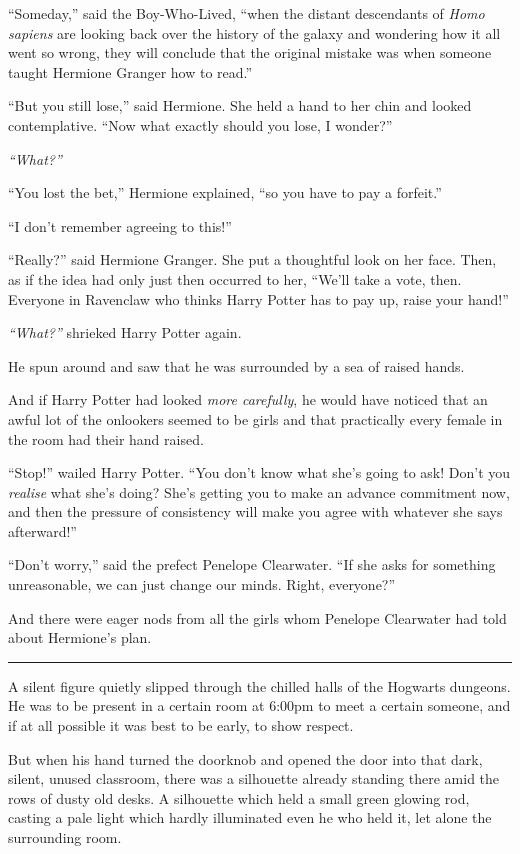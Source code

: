 ``Someday,'' said the Boy-Who-Lived, ``when the distant descendants of
\emph{Homo sapiens} are looking back over the history of the galaxy and
wondering how it all went so wrong, they will conclude that the original
mistake was when someone taught Hermione Granger how to read.''

``But you still lose,'' said Hermione. She held a hand to her chin and
looked contemplative. ``Now what exactly should you lose, I wonder?''

\emph{``What?''}

``You lost the bet,'' Hermione explained, ``so you have to pay a
forfeit.''

``I don't remember agreeing to this!''

``Really?'' said Hermione Granger. She put a thoughtful look on her
face. Then, as if the idea had only just then occurred to her, ``We'll
take a vote, then. Everyone in Ravenclaw who thinks Harry Potter has to
pay up, raise your hand!''

\emph{``What?''} shrieked Harry Potter again.

He spun around and saw that he was surrounded by a sea of raised hands.

And if Harry Potter had looked \emph{more carefully}, he would have
noticed that an awful lot of the onlookers seemed to be girls and that
practically every female in the room had their hand raised.

``Stop!'' wailed Harry Potter. ``You don't know what she's going to ask!
Don't you \emph{realise} what she's doing? She's getting you to make an
advance commitment now, and then the pressure of consistency will make
you agree with whatever she says afterward!''

``Don't worry,'' said the prefect Penelope Clearwater. ``If she asks for
something unreasonable, we can just change our minds. Right, everyone?''

And there were eager nods from all the girls whom Penelope Clearwater
had told about Hermione's plan.

\begin{center}\rule{3in}{0.4pt}\end{center}

A silent figure quietly slipped through the chilled halls of the
Hogwarts dungeons. He was to be present in a certain room at 6:00pm to
meet a certain someone, and if at all possible it was best to be early,
to show respect.

But when his hand turned the doorknob and opened the door into that
dark, silent, unused classroom, there was a silhouette already standing
there amid the rows of dusty old desks. A silhouette which held a small
green glowing rod, casting a pale light which hardly illuminated even he
who held it, let alone the surrounding room.

